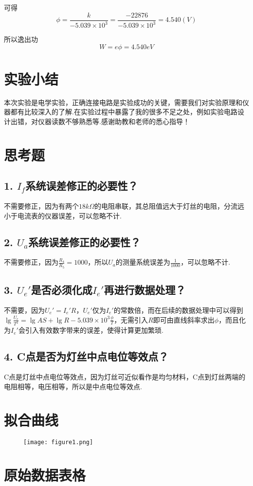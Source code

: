 \documentclass{thureport}
\begin{document}
可得
$$\phi=\frac{k}{-5.039\times10^3}=\frac{-22876}{-5.039\times10^3}=4.540(V)$$

所以逸出功
$$W=e\phi=4.540eV$$

\section{实验小结}
本次实验是电学实验，正确连接电路是实验成功的关键，需要我们对实验原理和仪器都有比较深入的了解.在实验过程中暴露了我的很多不足之处，例如实验电路设计出错，对仪器读数不够熟悉等.感谢助教和老师的悉心指导！

\section{思考题}
\subsection*{1. $I_f$系统误差修正的必要性？}
不需要修正，因为有两个$18k\Omega$的电阻串联，其总阻值远大于灯丝的电阻，分流远小于电流表的仪器误差，可以忽略不计.

\subsection*{2. $U_a$系统误差修正的必要性？}
不需要修正，因为$\frac{R_4}{R_5}=1000$，所以$U_a$的测量系统误差为$\frac{1}{1000}$，可以忽略不计.

\subsection*{3. $U_e'$是否必须化成$I_e'$再进行数据处理？}
不需要，因为$U_e'=I_e'R$，$U_e'$仅为$I_e'$的常数倍，而在后续的数据处理中可以得到$\lg\frac{U_e}{T^2}=\lg{AS}+\lg{R}-5.039\times10^3\frac{\phi}{T}$，无需引入$R$即可由直线斜率求出$\phi$，而且化为$I_e'$会引入有效数字带来的误差，使得计算更加繁琐.

\subsection*{4. C点是否为灯丝中点电位等效点？}
C点是灯丝中点电位等效点，因为灯丝可近似看作是均匀材料，C点到灯丝两端的电阻相等，电压相等，所以是中点电位等效点.

\clearpage
\section{拟合曲线}
\begin{figure}[h]
	\centering
	\texttt{[image: figure1.png]}
\end{figure}
\newpage
\section{原始数据表格}
\end{document}
